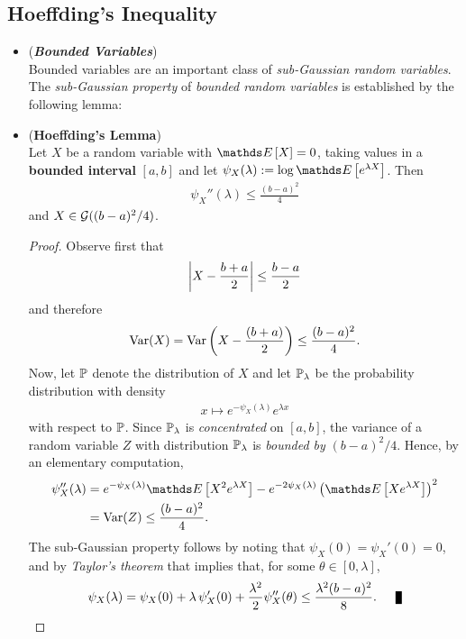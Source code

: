 \documentclass[11pt]{article}
\begin{document}
\subsection{Hoeffding's Inequality}
\begin{itemize}
\item \begin{remark} (\textbf{\emph{Bounded Variables}})\\
Bounded variables are an important class of \emph{sub-Gaussian random variables}. The \emph{sub-Gaussian property} of \emph{bounded random variables} is established by the
following lemma:
\end{remark}

\item \begin{lemma} (\textbf{Hoeffding's Lemma}) \citep{boucheron2013concentration} \\
Let $X$ be a random variable with $\E{}{X} = 0$, taking values in a \textbf{bounded interval} $[a, b]$ and let $\psi_{X}(\lambda) := \log  \E{}{e^{\lambda X}}$. Then
\begin{align*}
\psi_{X}''(\lambda) \le \frac{(b - a)^2}{4}
\end{align*}
and $X \in {\mathcal G}((b - a)^2/4)$.
\end{lemma}
\begin{proof}
Observe first that
\begin{align*}
\left\lvert X - \frac{b+a}{2} \right\rvert \le \frac{b - a}{2}
\end{align*}
and therefore
\begin{align*}
\text{Var}(X) = \text{Var}\left(X -  \frac{(b + a)}{2}\right) \le \frac{(b - a)^2}{4}.
\end{align*}
Now, let ${\mathbb P}$ denote the distribution of $X$ and let ${\mathbb P}_{\lambda}$ be the probability distribution with density
\begin{align*}
x \mapsto e^{-\psi_{X}(\lambda)}e^{\lambda x}
\end{align*}
with respect to ${\mathbb P}$. Since ${\mathbb P}_{\lambda}$ is \emph{concentrated} on $[a, b]$, the variance of a random variable $Z$
with distribution ${\mathbb P}_{\lambda}$ is \emph{bounded by} $(b - a)^2/4$. Hence, by an elementary computation,
\begin{align*}
\psi_{X}''(\lambda) &= e^{-\psi_X(\lambda)}\E{}{X^2e^{\lambda X}} - e^{-2\psi_X(\lambda)}\paren{\E{}{X e^{\lambda X}}}^2\\
& = \text{Var}(Z) \le \frac{(b - a)^2}{4}.
\end{align*}
The sub-Gaussian property follows by noting that $\psi_X(0) = \psi_X'(0) = 0$, and by \emph{Taylor's theorem} that implies that, for some $\theta \in [0, \lambda]$,
\begin{align*}
\psi_X(\lambda) = \psi_X(0) + \lambda\,\psi_X'(0) + \frac{\lambda^2}{2}  \psi_{X}''(\theta) \le \frac{\lambda^2(b - a)^2}{8}. \qed
\end{align*}
\end{proof}


\end{itemize}
\end{document}
